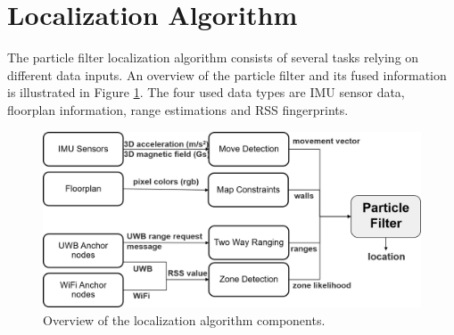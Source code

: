 
\section{Localization Algorithm}
The particle filter localization algorithm consists of several tasks relying on different data inputs. An overview of the particle filter and its fused information is illustrated in Figure \ref{fig:localization_algorithm}. The four used data types are IMU sensor data, floorplan information, range estimations and RSS fingerprints.\\
\begin{figure}[th]
\centering
\includegraphics[width=1.0\textwidth]{Figures/localization_algorithm}
\decoRule
\caption[Localization Algorithm]{Overview of the localization algorithm components.}
\label{fig:localization_algorithm}
\end{figure}

